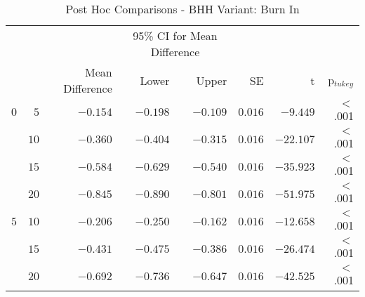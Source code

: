 \begin{table}[htbp]
	\centering
	\caption{Post Hoc Comparisons - BHH Variant: Burn In}
	\label{tab:results:burn_in:post_hoc}%
	\par\bigskip
	\resizebox{\textwidth}{!}
	{
				\begin{tabular}{lrrrrrrr}
							\toprule
							\multicolumn{1}{c}{} & \multicolumn{1}{c}{} & \multicolumn{1}{c}{} & \multicolumn{2}{c}{95\% CI for Mean Difference} & \multicolumn{1}{c}{} & \multicolumn{1}{c}{} & \multicolumn{1}{c}{}               \\
							\cline{4-5}
							$ $                  & $ $                  & Mean Difference      & Lower                                           & Upper                & SE                   & t                    & p$_{tukey}$ \\
							\cmidrule[0.4pt]{1-8}
							$0$                  & $5$                  & $-0.154$             & $-0.198$                                        & $-0.109$             & $0.016$              & $-9.449$             & $<$ .001    \\
							$ $                  & $10$                 & $-0.360$             & $-0.404$                                        & $-0.315$             & $0.016$              & $-22.107$            & $<$ .001    \\
																	 & $15$                 & $-0.584$             & $-0.629$                                        & $-0.540$             & $0.016$              & $-35.923$            & $<$ .001    \\
																	 & $20$                 & $-0.845$             & $-0.890$                                        & $-0.801$             & $0.016$              & $-51.975$            & $<$ .001    \\
							$5$                  & $10$                 & $-0.206$             & $-0.250$                                        & $-0.162$             & $0.016$              & $-12.658$            & $<$ .001    \\
							$ $                  & $15$                 & $-0.431$             & $-0.475$                                        & $-0.386$             & $0.016$              & $-26.474$            & $<$ .001    \\
																	 & $20$                 & $-0.692$             & $-0.736$                                        & $-0.647$             & $0.016$              & $-42.525$            & $<$ .001    \\

\end{tabular}}
\end{table}
